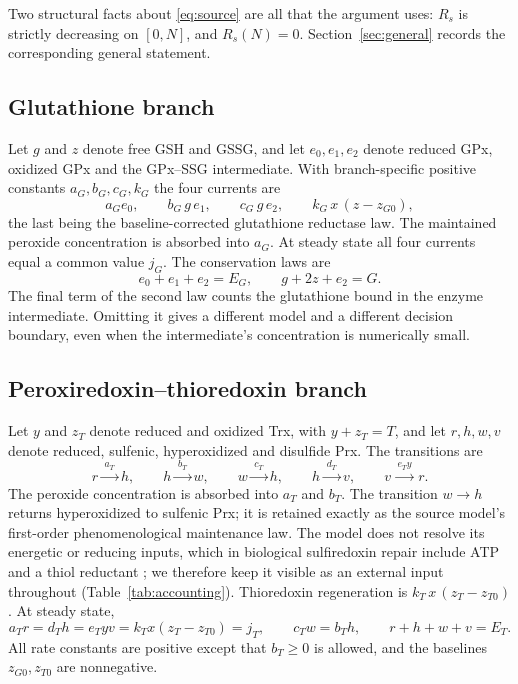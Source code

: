 \documentclass[11pt,a4paper]{article}
\theoremstyle{plain}
\theoremstyle{definition}
\theoremstyle{remark}
\begin{document}
Two structural facts about \eqref{eq:source} are all that the argument uses:
$R_s$ is strictly decreasing on $[0,N]$, and $R_s(N)=0$. Section~\ref{sec:general}
records the corresponding general statement.

\subsection{Glutathione branch}

Let $g$ and $z$ denote free GSH and GSSG, and let $e_0,e_1,e_2$ denote reduced
GPx, oxidized GPx and the GPx--SSG intermediate. With branch-specific positive
constants $a_G,b_G,c_G,k_G$ the four currents are
\begin{equation}\label{eq:gcurrents}
  a_Ge_0,\qquad b_G\,g\,e_1,\qquad c_G\,g\,e_2,\qquad k_G\,x\,(z-z_{G0}),
\end{equation}
the last being the baseline-corrected glutathione reductase law. The maintained
peroxide concentration is absorbed into $a_G$. At steady state all four currents
equal a common value $j_G$. The conservation laws are
\begin{equation}\label{eq:gpools}
  e_0+e_1+e_2=E_G,\qquad g+2z+e_2=G .
\end{equation}
The final term of the second law counts the glutathione bound in the enzyme
intermediate. Omitting it gives a different model and a different decision
boundary, even when the intermediate's concentration is numerically small.

\subsection{Peroxiredoxin--thioredoxin branch}

Let $y$ and $z_T$ denote reduced and oxidized Trx, with $y+z_T=T$, and let
$r,h,w,v$ denote reduced, sulfenic, hyperoxidized and disulfide Prx. The
transitions are
\begin{equation}\label{eq:prx}
  r\xrightarrow{\;a_T\;}h,\qquad h\xrightarrow{\;b_T\;}w,\qquad
  w\xrightarrow{\;c_T\;}h,\qquad h\xrightarrow{\;d_T\;}v,\qquad
  v\xrightarrow{\;e_Ty\;}r .
\end{equation}
The peroxide concentration is absorbed into $a_T$ and $b_T$. The transition
$w\to h$ returns hyperoxidized to sulfenic Prx; it is retained exactly as the
source model's first-order phenomenological maintenance law. The model does not
resolve its energetic or reducing inputs, which in biological sulfiredoxin repair
include ATP and a thiol reductant \citep{jonsson2008}; we therefore keep it
visible as an external input throughout (Table~\ref{tab:accounting}). Thioredoxin
regeneration is $k_T\,x\,(z_T-z_{T0})$. At steady state,
\begin{equation}\label{eq:tsteady}
  a_Tr=d_Th=e_Tyv=k_Tx(z_T-z_{T0})=j_T,\qquad c_Tw=b_Th,\qquad r+h+w+v=E_T .
\end{equation}
All rate constants are positive except that $b_T\ge0$ is allowed, and the
baselines $z_{G0},z_{T0}$ are nonnegative.
\end{document}
